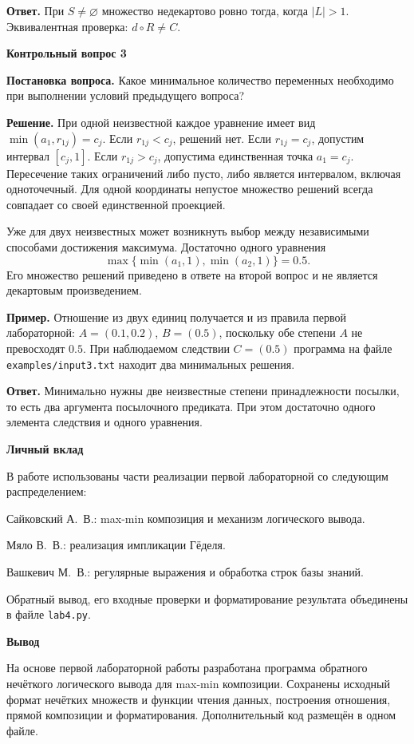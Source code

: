 \documentclass[14pt,a4paper]{extarticle}
\newcommand{\studentone}{Сайковский А.~В.}
\newcommand{\studenttwo}{Мяло В.~В.}
\newcommand{\studentthree}{Вашкевич М.~В.}
\newcommand{\reportheading}[1]{\par\vspace{0.8\baselineskip}\noindent\textbf{#1}\par\nobreak\vspace{0.35\baselineskip}\nobreak}
\begin{document}
\textbf{Ответ.} При $S\ne\varnothing$ множество недекартово ровно тогда, когда $|L|>1$. Эквивалентная проверка: $d\circ R\ne C$.

\clearpage
\reportheading{Контрольный вопрос 3}
\noindent\textbf{Постановка вопроса.} Какое минимальное количество переменных необходимо при выполнении условий предыдущего вопроса?

\textbf{Решение.} При одной неизвестной каждое уравнение имеет вид $\min(a_1,r_{1j})=c_j$. Если $r_{1j}<c_j$, решений нет. Если $r_{1j}=c_j$, допустим интервал $[c_j,1]$. Если $r_{1j}>c_j$, допустима единственная точка $a_1=c_j$. Пересечение таких ограничений либо пусто, либо является интервалом, включая одноточечный. Для одной координаты непустое множество решений всегда совпадает со своей единственной проекцией.

Уже для двух неизвестных может возникнуть выбор между независимыми способами достижения максимума. Достаточно одного уравнения
\[
 \max\{\min(a_1,1),\min(a_2,1)\}=0.5.
\]
Его множество решений приведено в ответе на второй вопрос и не является декартовым произведением.

\textbf{Пример.} Отношение из двух единиц получается и из правила первой лабораторной: $A=(0.1,0.2)$, $B=(0.5)$, поскольку обе степени $A$ не превосходят $0.5$. При наблюдаемом следствии $C=(0.5)$ программа на файле \texttt{examples/input3.txt} находит два минимальных решения.

\textbf{Ответ.} Минимально нужны две неизвестные степени принадлежности посылки, то есть два аргумента посылочного предиката. При этом достаточно одного элемента следствия и одного уравнения.

\clearpage

\reportheading{Личный вклад}
В работе использованы части реализации первой лабораторной со следующим распределением:

\studentone: max-min композиция и механизм логического вывода.

\studenttwo: реализация импликации Гёделя.

\studentthree: регулярные выражения и обработка строк базы знаний.

Обратный вывод, его входные проверки и форматирование результата объединены в файле \texttt{lab4.py}.

\reportheading{Вывод}
На основе первой лабораторной работы разработана программа обратного нечёткого логического вывода для max-min композиции. Сохранены исходный формат нечётких множеств и функции чтения данных, построения отношения, прямой композиции и форматирования. Дополнительный код размещён в одном файле.
\end{document}
